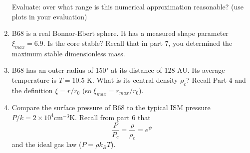 \documentclass{article}
\begin{document}
\begin{enumerate}
    

    Evaluate: over what range is this numerical approximation reasonable?
    (use plots in your evaluation)

 \item B68 is a real Bonnor-Ebert sphere.  It has a measured shape parameter $\xi_{max}=6.9$.
     Is the core stable?  Recall that in part 7, you determined the maximum stable dimensionless
     mass.

 \item B68 has an outer radius of 150" at its distance of 128 AU.  Its average temperature
     is $T=10.5$ K.  What is its central density $\rho_c$?  Recall Part 4 and the definition $\xi=r/r_0$ (so $\xi_{max} = r_{max}/r_0$).

 \item Compare the surface pressure of B68 to the typical ISM pressure $P/k = 2\times10^4 \mathrm{cm}^{-3} \mathrm{K}$.
    Recall from part 6 that $$\frac{P}{P_c} = \frac{\rho}{\rho_c} = e^\psi$$
    and the ideal gas law ($P = \rho k_B T$).
\end{enumerate}
\end{document}
